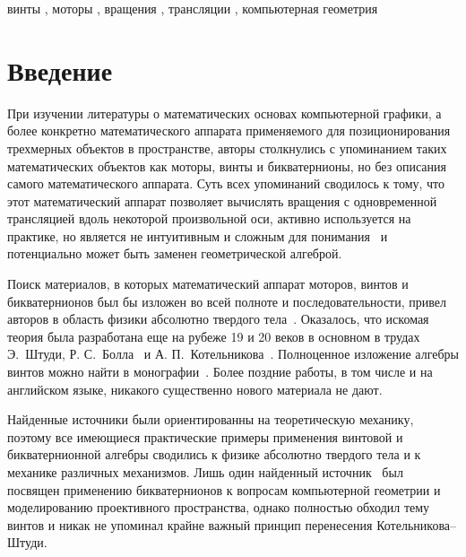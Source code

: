 \documentclass[%
]{ittmm}
\begin{document}
\begin{keywords}
  винты \sep
  моторы \sep
  вращения \sep
  трансляции \sep
  компьютерная геометрия
\end{keywords}

\maketitle

\section{Введение}
\label{sec:intro}

При изучении литературы о математических основах компьютерной графики,
а более конкретно математического аппарата применяемого для позиционирования трехмерных объектов в
пространстве, авторы столкнулись с упоминанием таких математических объектов как моторы, винты и
бикватернионы, но без описания самого математического аппарата. Суть всех упоминаний сводилось к тому,
что этот математический аппарат позволяет вычислять вращения с одновременной трансляцией вдоль некоторой
произвольной оси, активно используется на практике, но является не интуитивным и сложным для
понимания~\cite{Lengyel:GameEngine:v1:2016} и потенциально может быть заменен геометрической алгеброй.

Поиск материалов, в которых математический аппарат моторов, винтов и бикватернионов был бы изложен во
всей полноте и последовательности, привел авторов в область физики абсолютно твердого 
тела~\cite{Chelnokov:2006}. Оказалось, что искомая теория была разработана еще на рубеже 19 и 20 веков
в основном в трудах Э.~Штуди, Р. С.~Болла~\cite[73]{KleinHoherGeometrie} и 
А. П.~Котельникова~\cite{Kotelnikov:2019}. Полноценное изложение алгебры винтов можно найти в 
монографии~\cite{Dimentberg:1965}. Более поздние работы, в том числе и на английском языке, никакого 
существенно нового материала не дают.

Найденные источники были ориентированны на теоретическую механику, поэтому все имеющиеся практические 
примеры применения винтовой и бикватернионной алгебры сводились к физике абсолютно твердого тела и к 
механике различных механизмов. Лишь один найденный источник~\cite{Goldman2024} был посвящен применению
бикватернионов к вопросам компьютерной геометрии и моделированию проективного пространства, однако полностью
обходил тему винтов и никак не упоминал крайне важный принцип перенесения Котельникова--Штуди.
\end{document}
